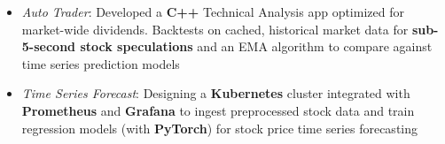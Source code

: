 \begin{itemize}
  \item \textit{Auto Trader}: Developed a \textbf{C++} Technical Analysis app optimized for market-wide dividends. Backtests on cached, historical market data for \textbf{sub-5-second stock speculations} and an EMA algorithm to compare against time series prediction models
  \item \textit{Time Series Forecast}: Designing a \textbf{Kubernetes} cluster integrated with \textbf{Prometheus} and \textbf{Grafana} to ingest preprocessed stock data and train regression models (with \textbf{PyTorch}) for stock price time series forecasting
\end{itemize}